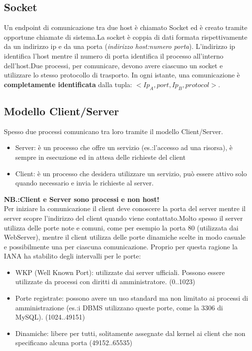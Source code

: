 \subsection{Socket}
Un endpoint di comunicazione tra due host è chiamato Socket ed è creato tramite opportune chiamate di sistema.La socket è coppia di dati formata rispettivamente da un indirizzo ip e da una porta (\textit{indirizzo host:numero porta}). L'indirizzo ip identifica l'host mentre il numero di porta identifica il processo all'interno dell'host.Due processi, per comunicare, devono avere ciascuno un socket e utilizzare lo stesso protocollo di trasporto. In ogni istante, una comunicazione è \textbf{completamente identificata} dalla tupla: $<Ip_{A},port,Ip_{B},protocol>$.
\subsection{Modello Client/Server}
Spesso due processi comunicano tra loro tramite il modello Client/Server.
\begin{itemize}
  \item Server: è un processo che offre un servizio (es.:l'accesso ad una risorsa), è sempre in esecuzione ed in attesa delle richieste del client
  \item Client: è un processo che desidera utilizzare un servizio, può essere attivo solo quando necessario e invia le richieste al server.
\end{itemize}
\textbf{NB.:Client e Server sono processi e non host!} \\
Per iniziare la comunicazione il client deve conoscere la porta del server mentre il server scopre l'indirizzo del client quando viene contattato.Molto spesso il server utilizza delle porte note e comuni, come per esempio la porta 80 (utilizzata dai WebServer), mentre il client utilizza delle porte dinamiche scelte in modo casuale e possibilmente una per ciascuna comunicazione. Proprio per questa ragione la IANA ha stabilito degli intervalli per le porte:
\begin{itemize}
  \item WKP (Well Known Port): utilizzate dai server ufficiali. Possono essere utilizzate da processi con diritti di amministratore. (0..1023)
  \item Porte registrate: possono avere un uso standard ma non limitato ai processi di amministrazione (es.:i DBMS utilizzano queste porte, come la 3306 di MySQL). (1024..49151)
  \item Dinamiche: libere per tutti, solitamente assegnate dal kernel ai client che non specificano alcuna porta (49152..65535)
\end{itemize}
